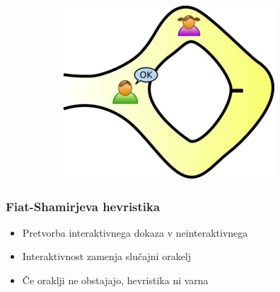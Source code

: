 \documentclass{beamer}    %
\begin{document}
\begin{frame}
\begin{figure}
\begin{subfigure}{0.3\textwidth}
        \end{subfigure}
        \hspace{0.25cm}
        \begin{subfigure}{0.3\textwidth}
            \includegraphics[width=\textwidth]{images/zkp3.png}
        \end{subfigure}
    \end{figure}
\end{frame}

\begin{frame}
    \frametitle{Fiat-Shamirjeva hevristika}
    \begin{itemize}
        \item Pretvorba interaktivnega dokaza v neinteraktivnega
        \item Interaktivnost zamenja slučajni orakelj
        \item Če oraklji ne obstajajo, hevristika ni varna
    \end{itemize}
\end{frame}
\end{document}
